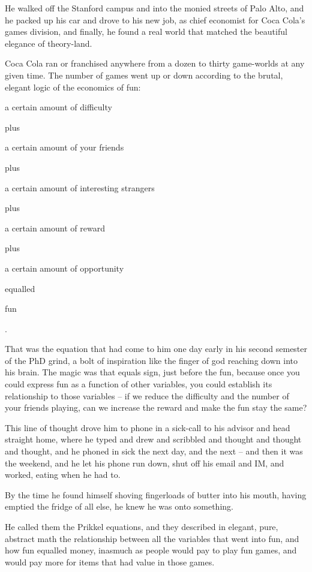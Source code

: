 He walked off the Stanford campus and into the monied streets of
Palo Alto, and he packed up his car and drove to his new job, as
chief economist for Coca Cola's games division, and finally, he
found a real world that matched the beautiful elegance of
theory-land.

Coca Cola ran or franchised anywhere from a dozen to thirty
game-worlds at any given time. The number of games went up or down
according to the brutal, elegant logic of the economics of fun:

a certain amount of difficulty

plus

a certain amount of your friends

plus

a certain amount of interesting strangers

plus

a certain amount of reward

plus

a certain amount of opportunity

equalled

fun

.

That was the equation that had come to him one day early in his
second semester of the PhD grind, a bolt of inspiration like the
finger of god reaching down into his brain. The magic was that
equals sign, just before the fun, because once you could express
fun as a function of other variables, you could establish its
relationship to those variables -- if we reduce the difficulty and
the number of your friends playing, can we increase the reward and
make the fun stay the same?

This line of thought drove him to phone in a sick-call to his
advisor and head straight home, where he typed and drew and
scribbled and thought and thought and thought, and he phoned in
sick the next day, and the next -- and then it was the weekend, and
he let his phone run down, shut off his email and IM, and worked,
eating when he had to.

By the time he found himself shoving fingerloads of butter into his
mouth, having emptied the fridge of all else, he knew he was onto
something.

He called them the Prikkel equations, and they described in
elegant, pure, abstract math the relationship between all the
variables that went into fun, and how fun equalled money, inasmuch
as people would pay to play fun games, and would pay more for items
that had value in those games.

